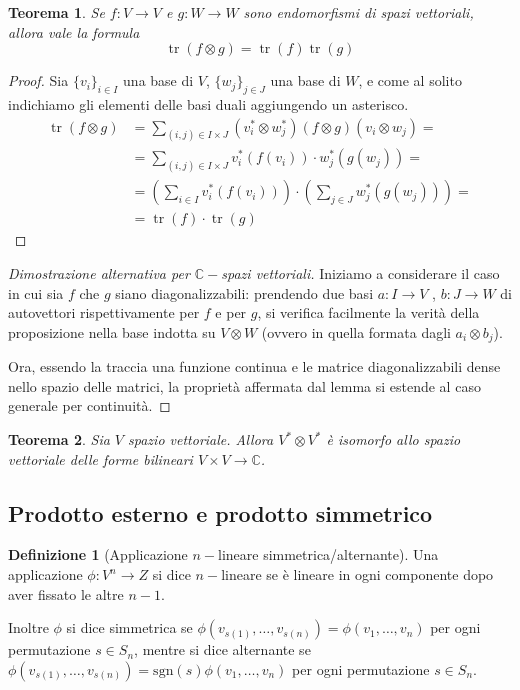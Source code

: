 \documentclass[11pt]{article}
\theoremstyle{plain}
\newtheorem{thm}{Teorema}[section]
\theoremstyle{definition}
\newtheorem{defn}{Definizione}[section]
\theoremstyle{remark}
\newcommand{\C}{\mathbb{C}}
\DeclareMathOperator{\tr}{tr}
\begin{document}
\begin{thm}
Se $f:V\to V$ e $g:W\to W$ sono endomorfismi di spazi vettoriali, allora vale la formula
\[\tr(f\otimes g) = \tr(f) \tr(g)  \]
\label{thm: tracciaprodotto}
\end{thm}
\begin{proof}
Sia $\{v_i\}_{i\in I}$ una base di $V$, $\{w_j\}_{j\in J}$ una base di $W$, e come al solito indichiamo gli elementi delle basi duali aggiungendo un asterisco.
\begin{align*}
 \tr(f\otimes g) &= \sum_{(i,j)\in I\times J} (v_i^*\otimes w_j^*) (f\otimes g)(v_i\otimes w_j) =\\
                 &= \sum_{(i,j)\in I\times J} v_i^*(f(v_i))\cdot w_j^*(g(w_j)) =\\
                 &= \left(\sum_{i\in I} v_i^*(f(v_i))\right) \cdot \left(\sum_{j\in J} w_j^*(g(w_j))\right) =\\
                 &= \tr(f) \cdot \tr(g)
\end{align*}
\end{proof}
\begin{proof}[Dimostrazione alternativa per $\C-$spazi vettoriali]
Iniziamo a considerare il caso in cui sia $f$ che $g$ siano diagonalizzabili: prendendo due basi $a:I\rightarrow V$ , $b:J\rightarrow W$ di autovettori rispettivamente per $f$ e per $g$, si verifica facilmente la verità della proposizione nella base indotta su $V\otimes W$ (ovvero in quella formata dagli $a_i\otimes b_j$).

Ora, essendo la traccia una funzione continua e le matrice diagonalizzabili dense nello spazio delle matrici, la proprietà affermata dal lemma si estende al caso generale per continuità.
\end{proof}

\begin{thm}
Sia $V$ spazio vettoriale. Allora $V^*\otimes V^*$ è isomorfo allo spazio vettoriale delle forme bilineari $V\times V\to \C$.
\end{thm}


\subsection{Prodotto esterno e prodotto simmetrico}

\begin{defn}[Applicazione $n-$lineare simmetrica/alternante]
 Una applicazione $\phi: V^n \to Z$ si dice $n-$lineare se è lineare in ogni componente dopo aver fissato le altre $n-1$.

 Inoltre $\phi$ si dice simmetrica se $\phi(v_{s(1)},\ldots,v_{s(n)})=\phi(v_1,\ldots,v_n)$ per ogni permutazione $s \in S_n$, mentre si dice
 alternante se $\phi(v_{s(1)},\ldots,v_{s(n)})=\mathrm{sgn}(s)\phi(v_1,\ldots,v_n)$ per ogni permutazione $s \in S_n$.
\end{defn}
\end{document}
